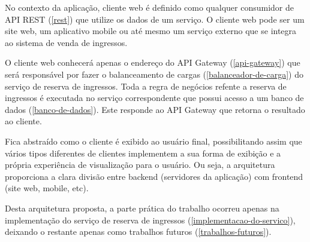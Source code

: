 No contexto da aplicação, cliente web é definido como qualquer consumidor
de API REST (\autoref{rest}) que utilize os dados de um serviço.
O cliente web pode ser um site web, um aplicativo mobile ou até mesmo um serviço
externo que se integra ao sistema de venda de ingressos.

O cliente web conhecerá apenas o endereço do API Gateway (\autoref{api-gateway})
que será responsável por fazer o balanceamento de cargas
(\autoref{balanceador-de-carga}) do serviço de reserva de ingressos.
Toda a regra de negócios refente a reserva de ingressos é executada no
serviço correspondente que possui acesso a um banco de dados (\autoref{banco-de-dados}).
Este responde ao API Gateway que retorna o resultado ao cliente.

Fica abstraído como o cliente é exibido ao usuário
final, possibilitando assim que vários tipos diferentes de clientes implementem
a sua forma de exibição e a própria experiência de visualização para o usuário.
Ou seja, a arquitetura proporciona a clara divisão entre backend
(servidores da aplicação) com frontend (site web, mobile, etc).

Desta arquitetura proposta, a parte prática do trabalho ocorreu apenas na
implementação do serviço de reserva de ingressos (\autoref{implementacao-do-servico}),
deixando o restante apenas como trabalhos futuros (\autoref{trabalhos-futuros}).
